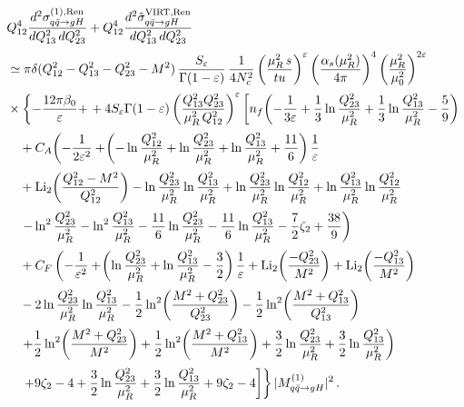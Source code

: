 \begin{equation}
\begin{aligned}
\label{eq:LO+virt-ren}
  &Q_{12}^4\frac{d^2\sigma_{q\bar{q}\to g H}^{(1),\rm Ren}}{dQ_{13}^2\,dQ_{23}^2}
  +Q_{12}^4\frac{d^2\hat\sigma_{q\bar{q}\to g H}^{\rm VIRT,Ren}}{dQ_{13}^2\,dQ_{23}^2}\\[0.5ex]
 &\simeq  \pi\delta(Q_{12}^2-Q_{13}^2-Q_{23}^2-M^2)\,
  \frac{S_\varepsilon}{\Gamma(1-\varepsilon)}
  \,\frac{1}{4N_c^2}
  \left(\frac{\mu_R^2\,s}{tu}\right)^\varepsilon
\left(\frac{\alpha_s(\mu_R^2)}{4\pi}\right)^4
\left(\frac{\mu_R^2}{\mu_0^2}\right)^{2\varepsilon}\\[0.5ex]
&\times\left\{-\frac{12 \pi \beta_0}{\varepsilon}+\right.+4 S_{\varepsilon}\Gamma(1-\varepsilon)
  \left(\frac{Q_{13}^2 Q_{23}^2}{\mu_R^2\,Q_{12}^2}\right)^\varepsilon \left[ n_f\!\left(-\frac{1}{3\varepsilon}
  +\frac{1}{3}\ln\frac{Q_{23}^2}{\mu_R^2}
  +\frac{1}{3}\ln\frac{Q_{13}^2}{\mu_R^2}
  -\frac{5}{9}\right) \right.\\[0.5ex]
   &\quad+C_A\!\left(-\frac{1}{2\varepsilon^2}
  +\!\left(-\ln\frac{Q_{12}^2}{\mu_R^2}
  +\ln\frac{Q_{23}^2}{\mu_R^2}
  +\ln\frac{Q_{13}^2}{\mu_R^2}
  +\frac{11}{6}\right)\frac{1}{\varepsilon}\right.\\[0.5ex]
  &\quad+\operatorname{Li}_2\!\left(
  \frac{Q_{12}^2-M^2}{Q_{12}^2}\right)
  -\ln\frac{Q_{23}^2}{\mu_R^2}\ln\frac{Q_{13}^2}{\mu_R^2}
  +\ln\frac{Q_{23}^2}{\mu_R^2}\ln\frac{Q_{12}^2}{\mu_R^2}
  +\ln\frac{Q_{13}^2}{\mu_R^2}\ln\frac{Q_{12}^2}{\mu_R^2}\\[0.5ex]
  &\quad\left.-\ln^2\frac{Q_{23}^2}{\mu_R^2}
  -\ln^2\frac{Q_{13}^2}{\mu_R^2}
  -\frac{11}{6}\ln\frac{Q_{23}^2}{\mu_R^2}
  -\frac{11}{6}\ln\frac{Q_{13}^2}{\mu_R^2}
  -\frac{7}{2}\zeta_2+\frac{38}{9}\right)\\[0.5ex]
  &\quad+C_F\left(-\frac{1}{\varepsilon^2}
  +\!\left(\ln\frac{Q_{23}^2}{\mu_R^2}
  +\ln\frac{Q_{13}^2}{\mu_R^2}-\frac{3}{2}\right)\frac{1}{\varepsilon}
  +\operatorname{Li}_2\!\left(\frac{-Q_{23}^2}{M^2}\right)
  +\operatorname{Li}_2\!\left(\frac{-Q_{13}^2}{M^2}\right)\right.\\[0.5ex]
  &\quad-2\ln\frac{Q_{23}^2}{\mu_R^2}\ln\frac{Q_{13}^2}{\mu_R^2}
  -\frac{1}{2}\ln^2\!\left(\frac{M^2+Q_{23}^2}{Q_{23}^2}\right)
  -\frac{1}{2}\ln^2\!\left(\frac{M^2+Q_{13}^2}{Q_{13}^2}\right)\\[0.5ex]
  &\quad\left.+\frac{1}{2}\ln^2\!\left(\frac{M^2+Q_{23}^2}{M^2}\right)
  +\frac{1}{2}\ln^2\!\left(\frac{M^2+Q_{13}^2}{M^2}\right)
  +\frac{3}{2}\ln\frac{Q_{23}^2}{\mu_R^2}
  +\frac{3}{2}\ln\frac{Q_{13}^2}{\mu_R^2}\right)\\[0.5ex]
  &\quad\left.\left.+9\zeta_2-4+\frac{3}{2}\ln\frac{Q_{23}^2}{\mu_R^2}
  +\frac{3}{2}\ln\frac{Q_{13}^2}{\mu_R^2}
  +9\zeta_2-4\right]\right\}|M^{(1)}_{q\bar{q}\to g H}|^2\,.
\end{aligned}
\end{equation}

